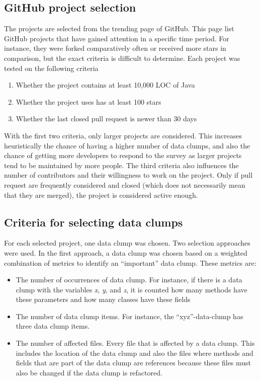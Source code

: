 \subsection{GitHub project selection}
The projects are selected from the trending page of GitHub. This page list GitHub projects that have gained attention in a specific time period. For instance, they were forked comparatively often or received more stars in comparison, but the exact criteria is difficult to determine. Each project was tested on the following criteria
\begin{enumerate}
    \item Whether the project contains at least  10,000 \ac{LOC} of Java
        \item Whether the project uses has at least 100 stars
    \item Whether the last closed pull request is newer than 30 days

\end{enumerate}

With the first two criteria,  only larger projects are considered. This increases heuristically the chance of having a higher number of data clumps, and also the chance of getting more developers to respond to the survey as larger projects tend to be maintained by more people. The third criteria also influences the number of contributors and their willingness to work on the project. Only if pull request are frequently considered and closed (which does not necessarily mean that they are merged), the project is considered active enough. 


\subsection{Criteria for selecting data clumps}

For each selected project, one data clump was chosen. Two selection approaches were used. 
In the first approach, a data clump was chosen based on a weighted combination of metrics to identify an \enquote{important} data clump. These metrics are:

\begin{itemize}
    \item The number of occurrences of data clump. For instance, if there is a data clump with the variables \textit{x}, \textit{y}, and  \textit{z}, it is counted how many methods have these parameters and how many classes have these fields

     \item The number of data clump items. For instance, the \enquote{xyz}-data-clump has three data clump items.
     
    \item The number of affected files. Every file that is affected by a data clump. This includes the location of the data clump and also the files where methods and fields that are part of the data clump are references because these files must also be changed if the data clump is refactored. 
    
\end{itemize}

